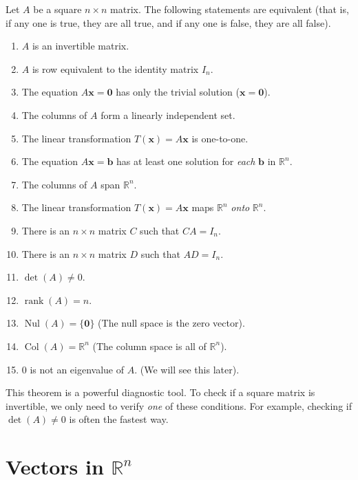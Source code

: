\begin{theorem}
Let $A$ be a square $n \times n$ matrix. The following statements are equivalent (that is, if any one is true, they are all true, and if any one is false, they are all false).
\begin{enumerate}
    \item $A$ is an invertible matrix.
    \item $A$ is row equivalent to the identity matrix $I_n$.
    \item The equation $A\mathbf{x} = \mathbf{0}$ has only the trivial solution ($\mathbf{x} = \mathbf{0}$).
    \item The columns of $A$ form a linearly independent set.
    \item The linear transformation $T(\mathbf{x}) = A\mathbf{x}$ is one-to-one.
    \item The equation $A\mathbf{x} = \mathbf{b}$ has at least one solution for \emph{each} $\mathbf{b}$ in $\mathbb{R}^n$.
    \item The columns of $A$ span $\mathbb{R}^n$.
    \item The linear transformation $T(\mathbf{x}) = A\mathbf{x}$ maps $\mathbb{R}^n$ \emph{onto} $\mathbb{R}^n$.
    \item There is an $n \times n$ matrix $C$ such that $CA = I_n$.
    \item There is an $n \times n$ matrix $D$ such that $AD = I_n$.
    \item $\det(A) \neq 0$.
    \item $\operatorname{rank}(A) = n$.
    \item $\operatorname{Nul}(A) = \{\mathbf{0}\}$ (The null space is the zero vector).
    \item $\operatorname{Col}(A) = \mathbb{R}^n$ (The column space is all of $\mathbb{R}^n$).
    \item 0 is not an eigenvalue of $A$. (We will see this later).
\end{enumerate}
\end{theorem}

This theorem is a powerful diagnostic tool. To check if a square matrix is invertible, we only need to verify \emph{one} of these conditions. For example, checking if $\det(A) \neq 0$ is often the fastest way.

\section{Vectors in $\mathbb{R}^n$}

